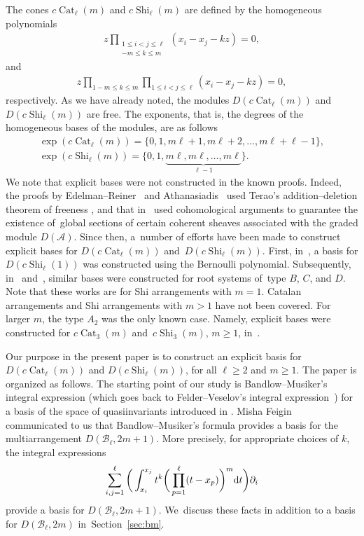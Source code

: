 \documentclass[pdftex]{sigma}
\numberwithin{equation}{section}
\newcommand{\A}{\mathcal{A}}
\newcommand{\B}{\mathcal{B}}
\newcommand{\Cat}{\operatorname{Cat}}
\newcommand{\Shi}{\operatorname{Shi}}
\begin{document}
The cones $c\Cat_\ell(m)$ and $c\Shi_\ell(m)$ are defined by the homogeneous
polynomials
\begin{gather*}
z\!\!\! \prod_{\substack{1\leq i<j\leq \ell\\ -m\leq k\leq m}}(x_i-x_j-kz)=0,
\end{gather*}
and %
\begin{gather*}
z\!\!\! \prod_{1-m\leq k\leq m}\prod_{1\leq i<j\leq \ell}(x_i-x_j-kz)=0,
\end{gather*}
respectively.
As we have already noted, the modules
$D(c\Cat_\ell(m))$ and $D(c\Shi_\ell(m))$ are free. The exponents, that
is, the degrees of the homogeneous bases of the modules, are as follows
\begin{gather*}
\exp(c\Cat_\ell(m))=\{0, 1, m\ell+1, m\ell+2, \dots, m\ell+\ell-1\},
\\
\exp(c\Shi_\ell(m))=\{0, 1, \underbrace{m\ell, m\ell, \dots, m\ell}_{\ell-1}\}.
\end{gather*}
We note that explicit bases were not constructed in the known proofs.
Indeed, the proofs by Edelman--Reiner~\cite{ede-rei} and
Athanasiadis~\cite{ath-free} used Terao's addition--deletion theorem
of freeness \cite[Theorem 4.51]{ot}, and that in~\cite{yos-char}
used cohomological arguments to guarantee the existence
of~glo\-bal sections of certain coherent sheaves associated with
the graded module $D(\A)$.
Since then, a~number of efforts have been made to construct explicit bases for
$D(c\Cat_\ell(m))$ and~$D(c\Shi_\ell(m))$.
First, in~\cite{su-te}, a basis for $D(c\Shi_\ell(1))$ was constructed
using the Bernoulli polynomial. Subsequently, in~\cite{gpt} and~\cite{su-bc},
similar bases were constructed for root systems of~type $B$, $C$, and $D$.
Note that these works are for Shi arrangements with $m=1$.
Catalan arran\-gements and Shi arrangements with $m>1$ have not been covered.
For larger $m$, the type
$A_2$ was the only known case. Namely, explicit bases were constructed
for $c\Cat_3(m)$ and~$c\Shi_3(m)$, $m\geq 1$, in~\cite{abe-suy}.

Our purpose in the present paper is to construct an explicit basis
for $D(c\Cat_\ell(m))$ and $D(c\Shi_\ell(m))$, for all $\ell\geq 2$ and $m\geq 1$.
The paper is organized as follows.
The starting point of our study is Bandlow--Musiker's integral expression
\cite{bm} (which goes back to Felder--Veselov's integral expression~\cite{fel-ves})
for a basis of the space of quasiinvariants introduced in
\cite{cha-ves, fei-ves}. Misha Feigin~\cite{feigin} communicated to us
that Bandlow--Musiker's formula provides a basis for the multiarrangement
$D(\B_\ell, 2m+1)$.
More precisely, for appropriate choices
of $k$, the integral expressions
\begin{gather}\label{eq:introbm}
\sum_{i, j=1}^\ell
\bigg(\int_{x_i}^{x_j}t^k\bigg(\prod_{p=1}^\ell(t-x_p)\bigg)^m {\rm d}t\bigg)\partial_i
\end{gather}
provide a basis for $D(\B_\ell, 2m+1)$. We~discuss these facts
in addition to a basis for $D(\B_\ell, 2m)$ in~Section~\ref{sec:bm}.
\end{document}
